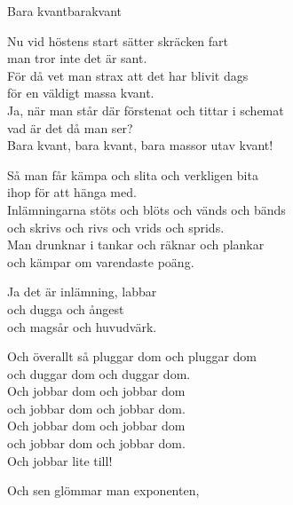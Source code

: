 \begin{song}{Bara kvant}{barakvant}
    \begin{vers}
    Nu vid höstens start sätter skräcken fart\\
    man tror inte det är sant.\\
    För då vet man strax att det har blivit dags\\
    för en väldigt massa kvant.\\
    Ja, när man står där förstenat och tittar i schemat\\
    vad är det då man ser?\\
    Bara kvant, bara kvant, bara massor utav kvant!\\
    \end{vers}
    \begin{vers}
    Så man får kämpa och slita och verkligen bita\\
    ihop för att hänga med.\\
    Inlämningarna stöts och blöts och vänds och bänds\\
    och skrivs och rivs och vrids och sprids.\\
    Man drunknar i tankar och räknar och plankar\\
    och kämpar om varendaste poäng.\\
    \end{vers}
    \begin{vers}
    Ja det är inlämning, labbar\\
    och dugga och ångest\\
    och magsår och huvudvärk.\\
    \end{vers}
    \begin{vers}
    Och överallt så pluggar dom och pluggar dom\\
    och duggar dom och duggar dom.\\
    Och jobbar dom och jobbar dom\\
    och jobbar dom och jobbar dom.\\
    Och jobbar dom och jobbar dom\\
    och jobbar dom och jobbar dom.\\
    Och jobbar lite till!\\
    \end{vers}
    \begin{vers}
    Och sen glömmar man exponenten,\\

\end{vers}
\end{song}
